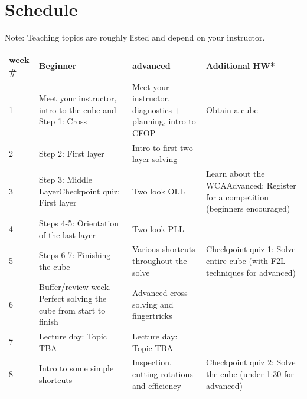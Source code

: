 \documentclass[11pt]{article}
\begin{document}
\section*{Schedule}
Note: Teaching topics are roughly listed and depend on your instructor.
\begin{center}
\begin{longtable}{|m{1cm}|m{4.6cm}|m{4.6cm}|m{4.6cm}|}
\hline
week \# &      Beginner     										&  advanced 																& Additional HW* \\ \hline
1  & Meet your instructor, intro to the cube and Step 1: Cross         & Meet your instructor, diagnostics + planning, intro to CFOP             & Obtain a cube                                                                  \\ \hline
2  & Step 2: First layer                                               & Intro to first two layer solving                                        &                                                                                \\ \hline
3  & Step 3: Middle LayerCheckpoint quiz: First layer                  & Two look OLL                                                            & Learn about the WCAAdvanced: Register for a competition (beginners encouraged) \\ \hline
4  & Steps 4-5: Orientation of the last layer                          & Two look PLL                                                            &                                                                                \\ \hline
5  & Steps 6-7: Finishing the cube                                     & Various shortcuts throughout the solve                                  & Checkpoint quiz 1: Solve entire cube (with F2L techniques for advanced)        \\ \hline
6  & Buffer/review week. Perfect solving the cube from start to finish & Advanced cross solving and fingertricks                                 &                                                                                \\ \hline
7  & Lecture day: Topic TBA                                            & Lecture day: Topic TBA                                                  &                                                                                \\ \hline
8  & Intro to some simple shortcuts                                    & Inspection, cutting rotations and efficiency                            & Checkpoint quiz 2: Solve the cube (under 1:30 for advanced)                    \\ \hline

\end{longtable}
\end{center}
\end{document}
